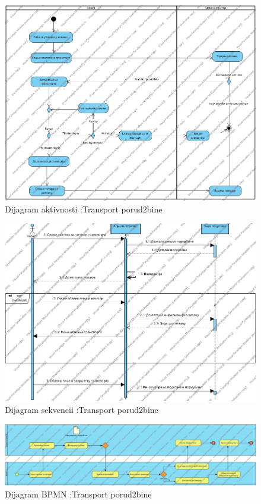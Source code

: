 \begin{figure}[h!]
	\includegraphics[scale=0.4]{Slike/SUdostavljanjePorudzbineActivity}
	\centering
	\caption{Dijagram aktivnosti :Transport porud2bine}
	\label{ucDostavljanjeAktivnost}
\end{figure}
\begin{figure}[h!]
	\includegraphics[scale=0.4]{Slike/SUdostavljanjePorudzbineDijagram Sekvenci}
	\centering
	\caption{Dijagram sekvencii :Transport porud2bine}
	\label{ucDostavljanjeSekvence}
\end{figure}
\begin{figure}[h!]
	\includegraphics[scale=0.28]{Slike/SUdostavljanjePorudzbineBPMN}
	\centering
	\caption{Dijagram BPMN :Transport porud2bine}
	\label{ucDostavljanjeBPMN}
\end{figure}







